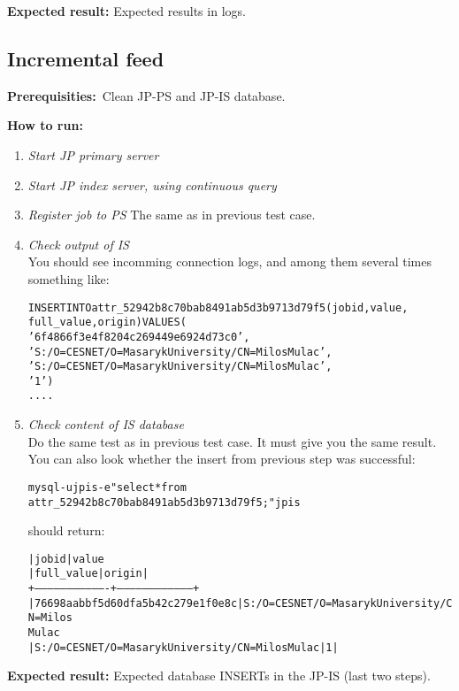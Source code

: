 \documentclass{egee}
\def\req{\noindent\textbf{Prerequisities:}}
\def\how{\noindent\textbf{How to run:}}
\def\result{\noindent\textbf{Expected result:}}
\begin{document}
\result{} Expected results in logs.


\subsection{Incremental feed}

\req\ Clean JP-PS and JP-IS database.

\how\
\begin{enumerate}
 \item \emph{Start JP primary server}
 \item \emph{Start JP index server, using continuous query}
 \item \emph{Register job to PS}
  The same as in previous test case.

 \item \emph{Check output of IS}\\
  You should see incomming connection logs, and among them
  several times something like:
  \begin{alltt}
    
   INSERT INTO attr_52942b8c70bab8491ab5d3b9713d79f5 (jobid, value,
                                        full_value, origin) VALUES (
     '6f4866f3e4f8204c269449e6924d73c0',
     'S:/O=CESNET/O=Masaryk University/CN=Milos Mulac',
     'S:/O=CESNET/O=Masaryk University/CN=Milos Mulac',
     '1')
   ....
  \end{alltt}
 \item \emph{Check content of IS database}\\
 Do the same test as in previous test case. It must give you the same
 result. You can also look whether the insert from previous step was 
 successful:
 \begin{alltt}
  mysql -u jpis -e "select * from
    attr_52942b8c70bab8491ab5d3b9713d79f5;" jpis
 \end{alltt}
  should return:
 \begin{alltt}
| jobid                            | value
| full_value                                      | origin |
+----------------------------------+-----------------------------------+
| 76698aabbf5d60dfa5b42c279e1f0e8c | S:/O=CESNET/O=Masaryk University/CN=Milos
Mulac 
| S:/O=CESNET/O=Masaryk University/CN=Milos Mulac |      1 |
 \end{alltt}
\end{enumerate}
\result{} Expected database INSERTs in the JP-IS (last two steps).
\end{document}
